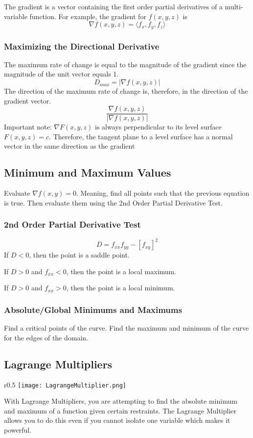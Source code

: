 \documentclass{article}
\begin{document}
The gradient is a vector containing the first order partial derivatives of a multi-variable function. For example, the gradient for $f(x,y,z)$ is
$$\nabla f(x,y,z) = \langle f_x, f_y, f_z \rangle$$

\subsubsection{Maximizing the Directional Derivative}
The maximum rate of change is equal to the magnitude of the gradient since the magnitude of the unit vector equals 1.
$$D_{max} = |\nabla f(x,y,z)|$$
The direction of the maximum rate of change is, therefore, in the direction of the gradient vector. 
$$\frac{\nabla f(x,y,z)}{|\nabla f(x,y,z)|}$$
Important note: $\nabla F(x,y,z)$ is always perpendicular to its level surface $F(x,y,z) = c$. Therefore, the tangent plane to a level surface has a normal vector in the same direction as the gradient

\subsection{Minimum and Maximum Values}
Evaluate $\nabla f(x,y) = 0$. Meaning, find all points such that the previous equation is true. Then evaluate them using the 2nd Order Partial Derivative Test. 

\subsubsection{2nd Order Partial Derivative Test}
$$D = f_{xx}f_{yy} - [f_{xy}]^2$$
If $D < 0$, then the point is a saddle point. 

If $D > 0$ and $f_{xx} < 0$, then the point is a local maximum.

If $D > 0$ and $f_{xx} > 0$, then the point is a local minimum.

\subsubsection{Absolute/Global Minimums and Maximums}
Find a critical points of the curve. Find the maximum and minimum of the curve for the edges of the domain. 

\subsection{Lagrange Multipliers}
\begin{wrapfigure}{r}{0.5\textwidth}
    \centering
    \texttt{[image: LagrangeMultiplier.png]}    
\end{wrapfigure}
With Lagrange Multipliers, you are attempting to find the absolute minimum and maximum of a function given certain restraints. The Lagrange Multiplier allows you to do this even if you cannot isolate one variable which makes it powerful. 
\end{document}
